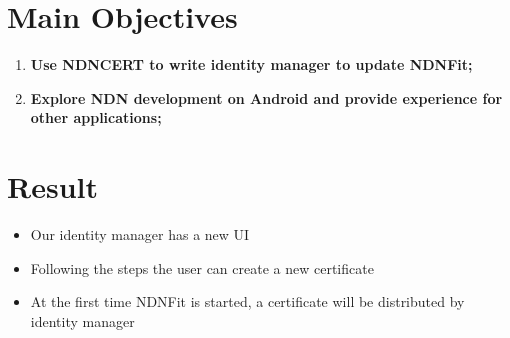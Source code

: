 \documentclass[a0,portrait]{poster}
\begin{document}
\begin{multicols}{2}

\section*{Main Objectives}

\begin{enumerate}
\item \textbf{Use NDNCERT to write identity manager to update NDNFit;}
\item \textbf{Explore NDN development on Android and provide experience for other applications;}
\end{enumerate}


\section*{Result}
\begin{itemize}
	\item Our identity manager has a new UI
	\item Following the steps the user can create a new certificate
	\item At the first time NDNFit is started, a certificate will be distributed by identity manager
\end{itemize}


\end{multicols}
\end{document}
